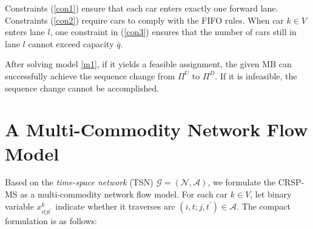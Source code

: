 \documentclass[12pt]{article}
\begin{document}
Constraints (\ref{con1}) ensure that each car enters exactly one forward lane. Constraints (\ref{con2}) require cars to comply with the FIFO rules. When car $k\in V$ enters lane $l$, one constraint in (\ref{con3}) ensures that the number of cars still in lane $l$ cannot exceed capacity $\bar{q}$.

After solving model \ref{m1}, if it yields a feasible assignment, the given MB can successfully achieve the sequence change from $\Pi^U$ to $\Pi^D$. If it is infeasible, the sequence change cannot be accomplished.



\section{A Multi-Commodity Network Flow Model}\label{app-sec3}
Based on the \textit{time-space network} (TSN) $\mathcal{G}=(\mathcal{N},\mathcal{A})$, we formulate the CRSP-MS as a multi-commodity network flow model. For each car $k\in V$, let binary variable $x^k_{itjt^{\prime}}$ indicate whether it traverses arc $(i,t;j,t^{\prime})\in \mathcal{A}$. The compact formulation is as follows:
\end{document}
